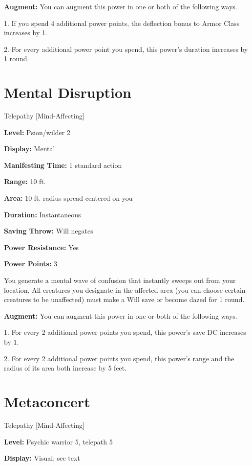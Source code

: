 \documentclass{article}
\begin{document}
\textbf{Augment:} You can augment this power in one or both of the following ways.

1. If you spend 4 additional power points, the deflection bonus to Armor Class 
increases by 1.

2. For every additional power point you spend, this power's duration increases 
by 1 round.

\vspace{12pt}
\section*{Mental Disruption}

Telepathy [Mind-Affecting]

\textbf{Level:} Psion/wilder 2

\textbf{Display:} Mental

\textbf{Manifesting Time:} 1 standard action

\textbf{Range:} 10 ft.

\textbf{Area:} 10-ft.-radius spread centered on you

\textbf{Duration:} Instantaneous

\textbf{Saving Throw:} Will negates

\textbf{Power Resistance:} Yes

\textbf{Power Points:} 3

You generate a mental wave of confusion that instantly sweeps out from your location. 
All creatures you designate in the affected area (you can choose certain creatures 
to be unaffected) must make a Will save or become dazed for 1 round.

\textbf{Augment:} You can augment this power in one or both of the following ways.

1. For every 2 additional power points you spend, this power's save DC increases 
by 1.

2. For every 2 additional power points you spend, this power's range and the radius 
of its area both increase by 5 feet.

\vspace{12pt}
\section*{Metaconcert}

Telepathy [Mind-Affecting]

\textbf{Level:} Psychic warrior 5, telepath 5

\textbf{Display:} Visual; see text
\end{document}
